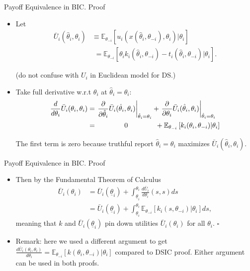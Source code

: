\documentclass[english,10pt
,aspectratio=169
,handout
]{beamer}
\begin{document}
\begin{frame}{Payoff Equivalence in BIC. Proof}
	\begin{itemize}
		\item Let 
		\vspace{-0.5em}\begin{align*}
		\bar{U}_i (\hat{\theta}_i,\theta_i) &\equiv \mathbb{E}_{\theta_{-i}} \left[ u_i \left( x(\hat{\theta}_i, \theta_{-i}), \theta_i \right) | \theta_i \right]
		\\
		&\,\,= \mathbb{E}_{\theta_{-i}} \left[ \theta_i k_i(\hat{\theta}_i, \theta_{-i}) - t_i \left( \hat{\theta}_i, \theta_{-i} \right) | \theta_i \right].
		\end{align*}\vspace{-1em}
		
		(do not confuse with $U_i$ in Euclidean model for DS.)
		\pause
		\item Take full derivative w.r.t $\theta_i$ at $\hat{\theta}_i=\theta_i$:
		\vspace{-0.5em}\begin{align*}
		\frac{d}{d \theta_i} \bar{U}_i (\theta_i,\theta_i) &= \left. \frac{\partial}{\partial \hat{\theta}_i} \bar{U}_i (\hat{\theta}_i,\theta_i) \right|_{\hat{\theta}_i=\theta_i} + \left. \frac{\partial}{\partial \theta_i} \bar{U}_i (\hat{\theta}_i,\theta_i) \right|_{\hat{\theta}_i=\theta_i}
		\\ &= \hspace{1.4cm} 0 \hspace{1.4cm} + \mathbb{E}_{\theta_{-i}} \left[k_i (\theta_i, \theta_{-i}) | \theta_i \right]
		\end{align*}\vspace{-1em}
		
		The first term is zero because truthful report $\hat{\theta}_i = \theta_i$ maximizes $\bar{U}_i (\hat{\theta}_i,\theta_i)$.
	\end{itemize}
\end{frame}


\begin{frame}{Payoff Equivalence in BIC. Proof}
	\begin{itemize}
		\item Then by the Fundamental Theorem of Calculus
		\begin{align*}
		\bar{U}_i (\theta_i) &= \bar{U}_i (\underline{\theta}_i) + \int_{\underline{\theta}_i}^{\theta_i} \frac{d \bar{U}_i}{d \theta_i}(s,s) d s
		\\&= \bar{U}_i (\underline{\theta}_i) + \int_{\underline{\theta}_i}^{\theta_i} \mathbb{E}_{\theta_{-i}} \left[k_i(s,\theta_{-i}) | \theta_i \right] d s,
		\end{align*}
		meaning that $k$ and $\bar{U}_i (\underline{\theta}_i)$ pin down utilities $\bar{U}_i (\theta_i)$ for all $\theta_i$. $\square$
		\medskip
		\item Remark: here we used a different argument to get $\frac{d \bar{U}_i (\theta_i,\theta_{i})}{d \theta_i} = \mathbb{E}_{\theta_{-i}} \left[k(\theta_i,\theta_{-i}) | \theta_i \right]$ compared to DSIC proof. Either argument can be used in both proofs.
	\end{itemize}
\end{frame}
\end{document}
